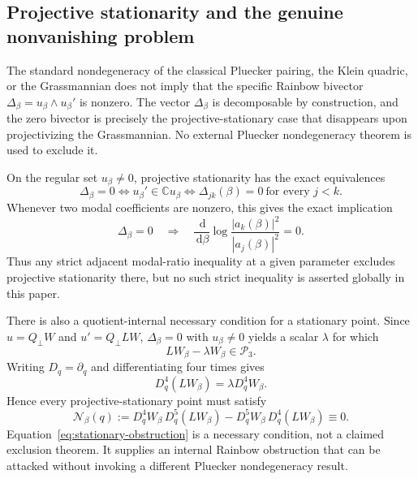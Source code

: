 \documentclass[11pt]{amsart}
\numberwithin{equation}{section}
\theoremstyle{plain}
\theoremstyle{definition}
\theoremstyle{remark}
\newcommand{\C}{\mathbb C}
\newcommand{\Pcal}{\mathcal P}
\newcommand{\dd}{\,\mathrm d}
\begin{document}
\subsection{Projective stationarity and the genuine nonvanishing problem}
\label{subsec:projective-stationarity}

The standard nondegeneracy of the classical Pluecker pairing, the Klein quadric, or the Grassmannian does not imply that the specific Rainbow bivector $\Delta_\beta=u_\beta\wedge u_\beta'$ is nonzero.  The vector $\Delta_\beta$ is decomposable by construction, and the zero bivector is precisely the projective-stationary case that disappears upon projectivizing the Grassmannian.  No external Pluecker nondegeneracy theorem is used to exclude it.

On the regular set $u_\beta\ne0$, projective stationarity has the exact equivalences
\begin{equation}
\boxed{
\Delta_\beta=0
\iff
u_\beta'\in\C u_\beta
\iff
\Delta_{jk}(\beta)=0\ \text{for every }j<k.
}
\label{eq:stationarity-equivalence}
\end{equation}
Whenever two modal coefficients are nonzero, this gives the exact implication
\begin{equation}
\Delta_\beta=0
\quad\Longrightarrow\quad
\frac{\dd}{\dd\beta}
\log\frac{|a_k(\beta)|^2}{|a_j(\beta)|^2}=0.
\label{eq:stationarity-ratio}
\end{equation}
Thus any strict adjacent modal-ratio inequality at a given parameter excludes projective stationarity there, but no such strict inequality is asserted globally in this paper.

There is also a quotient-internal necessary condition for a stationary point.  Since $u=Q_\perp W$ and $u'=Q_\perp LW$, $\Delta_\beta=0$ with $u_\beta\ne0$ yields a scalar $\lambda$ for which
\begin{equation}
LW_\beta-\lambda W_\beta\in\Pcal_3.
\label{eq:stationary-cubic}
\end{equation}
Writing $D_q=\partial_q$ and differentiating four times gives
\begin{equation}
D_q^4(LW_\beta)=\lambda D_q^4W_\beta.
\label{eq:stationary-fourth}
\end{equation}
Hence every projective-stationary point must satisfy
\begin{equation}
\boxed{
\mathscr N_\beta(q)
:=D_q^4W_\beta\,D_q^5(LW_\beta)
-D_q^5W_\beta\,D_q^4(LW_\beta)
\equiv0.
}
\label{eq:stationary-obstruction}
\end{equation}
Equation~\eqref{eq:stationary-obstruction} is a necessary condition, not a claimed exclusion theorem.  It supplies an internal Rainbow obstruction that can be attacked without invoking a different Pluecker nondegeneracy result.
\end{document}
